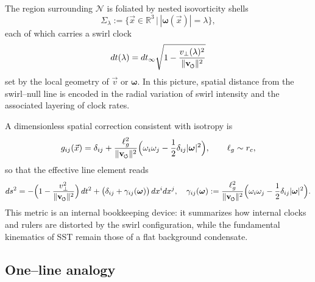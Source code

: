 \documentclass[11pt]{article}
\newcommand{\vnorm}{\lVert \mathbf{v}_{\mkern-2mu\scriptscriptstyle\boldsymbol{\circlearrowleft}} \rVert}               %
\newcommand{\rc}{r_c}                                    %
\begin{document}
        The region surrounding \(\mathcal{N}\) is foliated by nested isovorticity shells
        \begin{equation}
            \Sigma_\lambda
            :=
            \big\{
            \vec{x}\in\mathbb{R}^3
            \,\big|\,
            |\boldsymbol{\omega}(\vec{x})|=\lambda
            \big\},
        \end{equation}
        each of which carries a swirl clock
        \begin{equation}
            dt(\lambda)
            =
            dt_\infty\sqrt{
                1-\frac{v_\perp(\lambda)^2}{\vnorm^{2}}
            }
        \end{equation}
        set by the local geometry of \(\vec{v}\) or \(\boldsymbol{\omega}\). In this picture, spatial distance from the swirl–null line is encoded in the radial variation of swirl intensity and the associated layering of clock rates.

        A dimensionless spatial correction consistent with isotropy is
        \begin{equation}
            g_{ij}(\vec{x})
            =
            \delta_{ij}
            +
            \frac{\ell_g^{2}}{\vnorm^{2}}
            \Big(
            \omega_i\omega_j
            -\frac{1}{2}\delta_{ij}|\boldsymbol{\omega}|^{2}
            \Big),
            \qquad
            \ell_g\sim\rc,
            \label{eq:sst_induced_metric}
        \end{equation}
        so that the effective line element reads
        \begin{equation}
            ds^{2}
            =
            -\Big(1-\frac{v_\perp^{2}}{\vnorm^{2}}\Big)\,dt^{2}
            +
            \big(\delta_{ij}+\gamma_{ij}(\boldsymbol{\omega})\big)\,dx^{i}dx^{j},
            \quad
            \gamma_{ij}(\boldsymbol{\omega})
            :=
            \frac{\ell_g^{2}}{\vnorm^{2}}
            \Big(
            \omega_i\omega_j
            -\frac{1}{2}\delta_{ij}|\boldsymbol{\omega}|^{2}
            \Big).
        \end{equation}
        This metric is an internal bookkeeping device: it summarizes how internal clocks and rulers are distorted by the swirl configuration, while the fundamental kinematics of SST remain those of a flat background condensate.

    \subsection*{One–line analogy}
\end{document}
